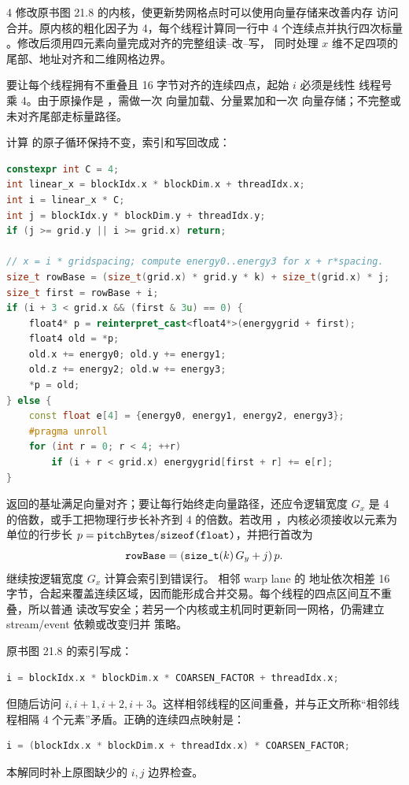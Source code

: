 \begin{solutionexercise}{4}
\problemheading 修改原书图 21.8 的内核，使更新势网格点时可以使用向量存储来改善内存
访问合并。原内核的粗化因子为 4，每个线程计算同一行中 4 个连续点并执行四次标量
。修改后须用四元素向量完成对齐的完整组读--改--写，
同时处理 $x$ 维不足四项的尾部、地址对齐和二维网格边界。

\approachheading 要让每个线程拥有不重叠且 16 字节对齐的连续四点，起始 $i$ 必须是线性
线程号乘 4。由于原操作是 \code{+=}，需做一次  向量加载、分量累加和一次
向量存储；不完整或未对齐尾部走标量路径。

\answerheading 计算  的原子循环保持不变，索引和写回改成：
\begin{lstlisting}[language=C++]
constexpr int C = 4;
int linear_x = blockIdx.x * blockDim.x + threadIdx.x;
int i = linear_x * C;
int j = blockIdx.y * blockDim.y + threadIdx.y;
if (j >= grid.y || i >= grid.x) return;

// x = i * gridspacing; compute energy0..energy3 for x + r*spacing.
size_t rowBase = (size_t(grid.x) * grid.y * k) + size_t(grid.x) * j;
size_t first = rowBase + i;
if (i + 3 < grid.x && (first & 3u) == 0) {
    float4* p = reinterpret_cast<float4*>(energygrid + first);
    float4 old = *p;
    old.x += energy0; old.y += energy1;
    old.z += energy2; old.w += energy3;
    *p = old;
} else {
    const float e[4] = {energy0, energy1, energy2, energy3};
    #pragma unroll
    for (int r = 0; r < 4; ++r)
        if (i + r < grid.x) energygrid[first + r] += e[r];
}
\end{lstlisting}
 返回的基址满足向量对齐；要让每行始终走向量路径，还应令逻辑宽度
$G_x$ 是 4 的倍数，或手工把物理行步长补齐到 4 的倍数。若改用
，内核必须接收以元素为单位的行步长
$p=\code{pitchBytes}/\code{sizeof(float)}$，并把行首改为
\[
  \code{rowBase}=(\code{size_t}(k)\,G_y+j)\,p.
\]
继续按逻辑宽度 $G_x$ 计算会索引到错误行。
相邻 warp lane 的  地址依次相差
16 字节，合起来覆盖连续区域，因而能形成合并交易。每个线程的四点区间互不重叠，所以普通
读改写安全；若另一个内核或主机同时更新同一网格，仍需建立 stream/event 依赖或改变归并
策略。

\editorialnote 原书图 21.8 的索引写成：
\begin{lstlisting}[language=C++,numbers=none]
i = blockIdx.x * blockDim.x * COARSEN_FACTOR + threadIdx.x;
\end{lstlisting}
但随后访问 $i,i+1,i+2,i+3$。这样相邻线程的区间重叠，并与正文所称“相邻线程相隔
4 个元素”矛盾。正确的连续四点映射是：
\begin{lstlisting}[language=C++,numbers=none]
i = (blockIdx.x * blockDim.x + threadIdx.x) * COARSEN_FACTOR;
\end{lstlisting}
本解同时补上原图缺少的 $i,j$ 边界检查。


\end{solutionexercise}
